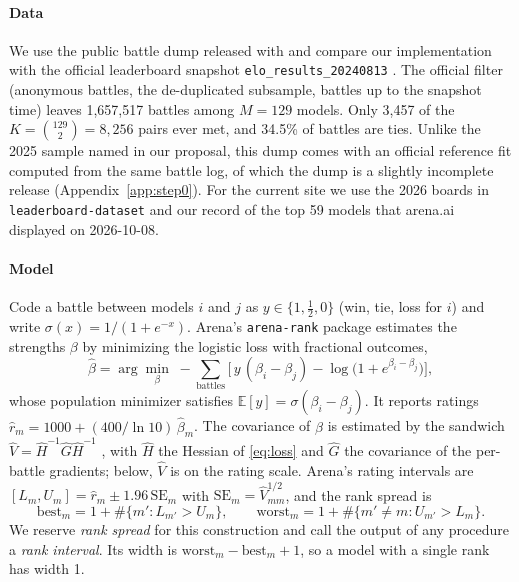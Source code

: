 \documentclass[12pt]{article}
\newcommand{\SE}{\mathrm{SE}}
\newcommand{\hb}{\hat\beta}
\begin{document}
\paragraph{Data} We use the public battle dump \citep{lmsys2024dump} released with \citet{chiang2024arena} and compare our implementation with the official leaderboard snapshot \texttt{elo\_results\_20240813} \citep[last updated \mbox{2024-08-12};][]{lmarena2024snapshot}. The official filter (anonymous battles, the de-duplicated subsample, battles up to the snapshot time) leaves 1,657,517 battles among $M = 129$ models. Only 3,457 of the $K = \binom{129}{2} = 8{,}256$ pairs ever met, and 34.5\% of battles are ties. Unlike the 2025 sample named in our proposal, this dump comes with an official reference fit computed from the same battle log, of which the dump is a slightly incomplete release (Appendix~\ref{app:step0}). For the current site we use the 2026 boards in \texttt{leaderboard-dataset} \citep[downloaded 2026-10-28;][]{lmarena2026dataset} and our record of the top 59 models that arena.ai displayed on 2026-10-08.

\paragraph{Model} Code a battle between models $i$ and $j$ as $y \in \{1, \tfrac12, 0\}$ (win, tie, loss for $i$) and write $\sigma(x) = 1/(1 + e^{-x})$. Arena's \texttt{arena-rank} package estimates the strengths $\beta$ by minimizing the logistic loss with fractional outcomes,
\begin{equation}\label{eq:loss}
\hb = \arg\min_{\beta}\; -\sum_{\text{battles}} \bigl[\,y\,(\beta_i - \beta_j) - \log\bigl(1 + e^{\beta_i - \beta_j}\bigr)\bigr],
\end{equation}
whose population minimizer satisfies $\mathbb E[y] = \sigma(\beta_i - \beta_j)$. It reports ratings $\hat r_m = 1000 + (400/\ln 10)\,\hb_m$. The covariance of $\hb$ is estimated by the sandwich $\hat V = \hat H^{-1}\hat G\hat H^{-1}$ \citep{white1980heteroskedasticity}, with $\hat H$ the Hessian of \eqref{eq:loss} and $\hat G$ the covariance of the per-battle gradients; below, $\hat V$ is on the rating scale. Arena's rating intervals are $[L_m, U_m] = \hat r_m \pm 1.96\,\SE_m$ with $\SE_m = \hat V_{mm}^{1/2}$, and the rank spread is
\begin{equation}\label{eq:spread}
\text{best}_m = 1 + \#\{m' : L_{m'} > U_m\}, \qquad \text{worst}_m = 1 + \#\{m' \neq m : U_{m'} > L_m\}.
\end{equation}
We reserve \emph{rank spread} for this construction and call the output of any procedure a \emph{rank interval}. Its width is $\text{worst}_m - \text{best}_m + 1$, so a model with a single rank has width 1.
\end{document}
